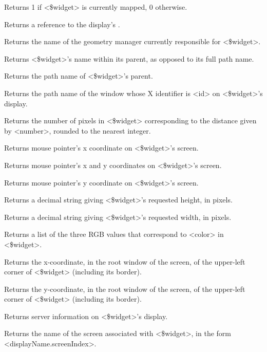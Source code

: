 \begin{enum}{1cm}
Returns 1 if <\$widget> is currently mapped, 0 otherwise.

Returns a reference to the display's .

Returns the name of the geometry manager currently responsible for
<\$widget>.

Returns <\$widget>'s name within its parent, as opposed to its full path
name.

Returns the path name of <\$widget>'s parent.

Returns the path name of the window whose X identifier is <id> on
<\$widget>'s display.

Returns the number of pixels in <\$widget> corresponding to the distance
given by <number>, rounded to the nearest integer.

Returns mouse pointer's x coordinate on <\$widget>'s screen.

Returns mouse pointer's x and y coordinates on <\$widget>'s screen.

Returns mouse pointer's y coordinate on <\$widget>'s screen.

Returns a decimal string giving <\$widget>'s requested height, in pixels.

Returns a decimal string giving <\$widget>'s requested width, in pixels.

Returns a list of the three RGB values that correspond to <color> in <\$widget>.

Returns the x-coordinate, in the root window of the screen, of the
upper-left corner of <\$widget> (including its border).

Returns the y-coordinate, in the root window of the screen, of the
upper-left corner of <\$widget> (including its border).

Returns server information on <\$widget>'s display.

Returns the name of the screen associated with <\$widget>, in the form
<displayName.screenIndex>.


\end{enum}
